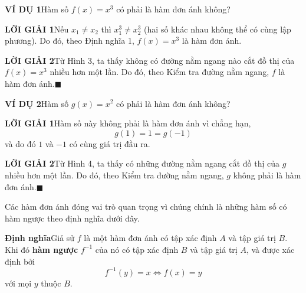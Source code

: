 \begin{minipage}[t]{0.708\textwidth}
    \fontsize{9.3pt}{13.2pt}\selectfont
    \noindent\textbf{\textsf{\color{stewartcyan}VÍ DỤ 1}}\quad Hàm số $f(x) = x^3$ có phải là hàm đơn ánh không?

    \vspace{0.3em}
    \noindent\textbf{\textsf{\color{stewartcyan}LỜI GIẢI 1}}\quad Nếu $x_1 \neq x_2$ thì $x_1^3 \neq x_2^3$ (hai số khác nhau không thể có cùng lập phương). Do đó, theo Định nghĩa 1, $f(x) = x^3$ là hàm đơn ánh.

    \vspace{0.3em}
    \noindent\textbf{\textsf{\color{stewartcyan}LỜI GIẢI 2}}\quad Từ Hình 3, ta thấy không có đường nằm ngang nào cắt đồ thị của $f(x) = x^3$ nhiều hơn một lần. Do đó, theo Kiểm tra đường nằm ngang, $f$ là hàm đơn ánh.\hfill{\color{stewartcyan}$\blacksquare$}

    \vspace{1.2em}
    \noindent\textbf{\textsf{\color{stewartcyan}VÍ DỤ 2}}\quad Hàm số $g(x) = x^2$ có phải là hàm đơn ánh không?

    \vspace{0.3em}
    \noindent\textbf{\textsf{\color{stewartcyan}LỜI GIẢI 1}}\quad Hàm số này không phải là hàm đơn ánh vì chẳng hạn,
    \[
    g(1) = 1 = g(-1)
    \]
    và do đó $1$ và $-1$ có cùng giá trị đầu ra.

    \vspace{0.3em}
    \noindent\textbf{\textsf{\color{stewartcyan}LỜI GIẢI 2}}\quad Từ Hình 4, ta thấy có những đường nằm ngang cắt đồ thị của $g$ nhiều hơn một lần. Do đó, theo Kiểm tra đường nằm ngang, $g$ không phải là hàm đơn ánh.\hfill{\color{stewartcyan}$\blacksquare$}

    \vspace{0.8em}
    Các hàm đơn ánh đóng vai trò quan trọng vì chúng chính là những hàm số có hàm ngược theo định nghĩa dưới đây.

    \vspace{0.6em}
    \begin{definitionbox}
        \hspace{0.6em}\textbf{\textsf{\color{stewartred}Định nghĩa}}\quad Giả sử $f$ là một hàm đơn ánh có tập xác định $A$ và tập giá trị $B$. Khi đó \textbf{hàm ngược} $f^{-1}$ của nó có tập xác định $B$ và tập giá trị $A$, và được xác định bởi
        \[
        f^{-1}(y) = x \iff f(x) = y
        \]
        với mọi $y$ thuộc $B$.
    \end{definitionbox}


\end{minipage}

